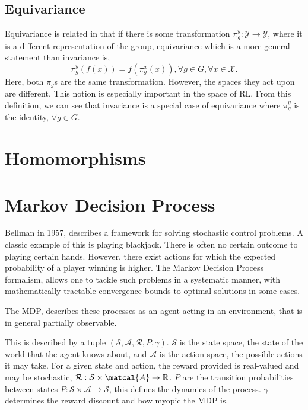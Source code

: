 \subsection{Equivariance}
Equivariance is related in that if there is some transformation $\pi_g^y: \mathcal{Y} \rightarrow \mathcal{Y}$, where it is a different representation of the group, equivariance which is a more general statement than invariance is,
\begin{equation}
	\pi_g^y( f(x) )= f(\pi_g^x( x)), \forall g \in G, \forall x \in \mathcal{X}.
\end{equation}
Here, both $\pi_g$s are the same transformation. However, the spaces they act upon are different. This notion is especially important in the space of RL. From this definition, we can see that invariance is a special case of equivariance where $\pi^y_g$ is the identity, $\forall g \in G$.
\section{Homomorphisms}
\section{Markov Decision Process}

Bellman\cite{bel} in 1957, describes a framework for solving stochastic control problems. A classic example of this is playing blackjack. There is often no certain outcome to playing certain hands. However, there exist actions for which the expected probability of a player winning is higher. The Markov Decision Process formalism, allows one to tackle such problems in a systematic manner, with mathematically tractable convergence bounds to optimal solutions in some cases.

The MDP, describes these processes as an agent acting in an environment, that is in general partially observable.

This is described by a tuple $(\mathcal{S}, \mathcal{A}, \mathcal{R}, P, \gamma)$. $\mathcal{S}$ is the state space, the state of the world that the agent knows about, and $\mathcal{A}$ is the action space, the possible actions it may take. For a given state and action, the reward provided is real-valued and may be stochastic, $\mathcal{R}: \mathcal{S} \times \matcal{A} \rightarrow \mathbb{R}$. $P$ are the transition probabilities between states $P: \mathcal{S} \times \mathcal{A} \rightarrow \mathcal{S}$, this defines the dynamics of the process. $\gamma $ determines the reward discount and how myopic the MDP is.

